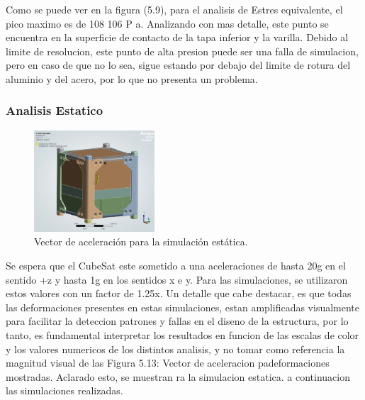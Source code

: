       Como se puede ver en la figura (5.9), para el analisis de Estres equivalente, el pico maximo
      es de 108  106 P a. Analizando con mas detalle, este punto se encuentra en la superficie de
      contacto de la tapa inferior y la varilla. Debido al limite de resolucion, este punto de alta
      presion puede ser una falla de simulacion, pero en caso de que no lo sea, sigue estando por
      debajo del limite de rotura del aluminio y del acero, por lo que no presenta un problema.

    \subsubsection{Analisis Estatico}
      \begin{minipage}{\textwidth}
        \begin{figure}
          \centering
          \includegraphics[width=0.4\textwidth]{image/fem/ansys_cubesat-static_acceleration.png}
          \caption{Vector de aceleración para la simulación estática.}
          \label{fig:fem_static_acc}
        \end{figure}
        \hspace*{2em}
        Se espera que el CubeSat este sometido a una aceleraciones de hasta 20g en el sentido +z y hasta 1g en
        los sentidos x e y. Para las simulaciones, se utilizaron
        estos valores con un factor de 1.25x. Un detalle que cabe destacar, es que todas las deformaciones presentes
        en estas simulaciones, estan amplificadas visualmente para facilitar la deteccion patrones y fallas en el
        diseno de la estructura, por lo tanto, es fundamental
        interpretar los resultados en funcion de las escalas de
        color y los valores numericos de los distintos analisis,
        y no tomar como referencia la magnitud visual de las
        Figura 5.13: Vector de aceleracion padeformaciones mostradas. Aclarado esto, se muestran
        ra la simulacion estatica.
        a continuacion las simulaciones realizadas.
      \end{minipage}

